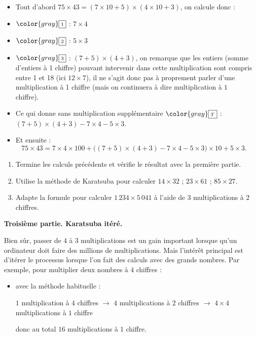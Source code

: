 \documentclass[class=report,crop=false, 12pt]{standalone}
\begin{document}
\begin{activite}
\begin{itemize}
  \item Tout d'abord $75 \times 43  = (7 \times 10 + 5) \times (4 \times 10 + 3)$, on calcule donc :
  \item $\color{gray}\fbox{\text{\scriptsize 1}}$ : $7 \times 4$
  \item $\color{gray}\fbox{\text{\scriptsize 2}}$ : $5 \times 3$
  \item $\color{gray}\fbox{\text{\scriptsize 3}}$ : $(7+5) \times (4+3)$, on remarque que les entiers (somme d'entiers à 1 chiffre) pouvant intervenir dans cette multiplication sont compris entre 1 et 18 (ici $12\times 7$), il ne s'agit donc pas à proprement parler d'une multiplication à 1 chiffre (mais on continuera à dire \og multiplication à $1$ chiffre\fg{}).
  \item Ce qui donne sans multiplication supplémentaire $\color{gray}\fbox{\text{\scriptsize 3'}}$ :
  $(7+5) \times (4+3) - 7 \times 4 - 5 \times 3$.
  \item Et ensuite :
  $$75 \times 43 = 7 \times 4 \times 100
  + \Big((7+5) \times (4+3) - 7 \times 4 - 5 \times 3 \Big) \times 10
  + 5 \times 3.$$
\end{itemize}

  
\begin{enumerate} 
  \item Termine les calculs précédents et vérifie le résultat avec la première partie.  

  \item Utilise la méthode de Karatsuba pour calculer $14 \times 32$ ; $23 \times 61$ ; $85 \times 27$.

  \item Adapte la formule pour calculer $1\,234 \times 5\,041$ à l'aide de $3$ multiplications à $2$ chiffres.
\end{enumerate}  
 
\bigskip
\medskip

\textbf{Troisième partie. Karatsuba itéré.} 
 
Bien sûr, passer de $4$ à $3$ multiplications est un gain important lorsque qu'un ordinateur doit faire des millions de multiplications. Mais l'intérêt principal est d'itérer le processus lorsque l'on fait des calculs avec des grands nombres.
Par exemple, pour multiplier deux nombres à $4$ chiffres :
\begin{itemize}
  \item avec la méthode habituelle :  
  
  \centerline{\small
   $1$ multiplication à $4$ chiffres 
  $\longrightarrow$ $4$ \og multiplications à $2$ chiffres\fg{}
  $\longrightarrow$ $4 \times 4$ \og multiplications à $1$ chiffre\fg{}
  }
  donc au total $16$ multiplications à $1$ chiffre.
  

\end{itemize}
\end{activite}
\end{document}
